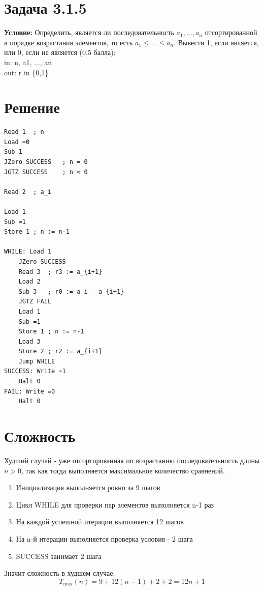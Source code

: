 \documentclass[12pt]{article}
\begin{document}
\section*{Задача 3.1.5}

\textbf{Условие:} Определить, является ли последовательность \(a_1, \dots, a_n\) отсортированной в порядке возрастания элементов, то есть \(a_1 \le \dots \le a_n\). Вывести 1, если является, или 0, если не является (0.5 балла):\\
in: n, a1, ..., an \\
out: r in \{0,1\}

\section*{Решение}

\begin{verbatim}
Read 1  ; n
Load =0
Sub 1
JZero SUCCESS   ; n = 0
JGTZ SUCCESS    ; n < 0

Read 2  ; a_i

Load 1
Sub =1
Store 1 ; n := n-1

WHILE: Load 1
    JZero SUCCESS
    Read 3  ; r3 := a_{i+1}
    Load 2
    Sub 3   ; r0 := a_i - a_{i+1}
    JGTZ FAIL
    Load 1
    Sub =1
    Store 1 ; n := n-1
    Load 3
    Store 2 ; r2 := a_{i+1}
    Jump WHILE
SUCCESS: Write =1
    Halt 0
FAIL: Write =0
    Halt 0
\end{verbatim}

\section*{Сложность}

Худший случай - уже отсортированная по возрастанию последовательность длины $n > 0$, так как тогда выполняется максимальное количество сравнений.

\begin{enumerate}
    \item Инициализация выполняется ровно за 9 шагов
    \item Цикл WHILE для проверки пар элементов выполняется n-1 раз
    \item На каждой успешной итерации выполняется 12 шагов
    \item На n-й итерации выполняется проверка условия - 2 шага
    \item SUCCESS занимает 2 шага
\end{enumerate}

Значит сложность в худшем случае:
\[
    T_{\max}(n) = 9 + 12(n - 1) + 2 + 2 = 12n + 1
\]
\end{document}
